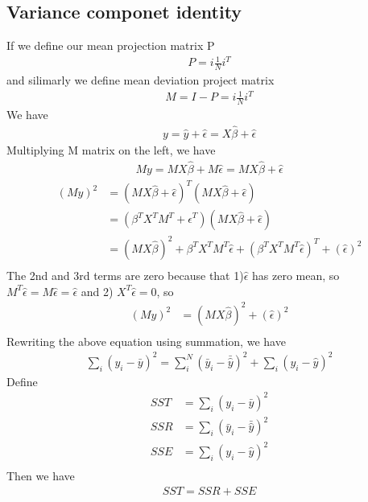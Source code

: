 \documentclass[a4paper]{article}
\begin{document}
\subsection{Variance componet identity}
If we define our mean projection matrix P 
\begin{align*}
P = i \frac{1}{N}i^T
\end{align*}
and silimarly we define mean deviation project matrix 
\begin{align*}
M= I-P = i\frac{1}{N}i^T
\end{align*}
We have
\begin{align*}
y= \hat y + \hat \epsilon = X\hat \beta + \hat \epsilon
\end{align*}
Multiplying M matrix on the left, we have
\begin{align*}
My= MX\hat \beta + M \hat \epsilon = MX\hat \beta +\hat \epsilon
\end{align*}
\begin{align*}
(My)^2 &= (MX\hat \beta + \hat \epsilon)^T(MX\hat \beta +  \hat \epsilon) \\
&=(\beta^T X^T M^T + \hat \epsilon^T )(MX\hat \beta + \hat \epsilon) \\
&=(MX\hat \beta)^2 + \beta^T X^T M^T \hat \epsilon+ (\beta^T X^T M^T \hat \epsilon)^T  + (\hat \epsilon)^2\\
\end{align*}
The 2nd and 3rd terms are zero because that 1)$\hat \epsilon$ has zero mean, so $M^T\hat \epsilon = M \hat \epsilon = \hat \epsilon$ and 2) $X^T\hat \epsilon = 0$, so
\begin{align*}
(My)^2 &=(MX\hat \beta)^2 + (\hat \epsilon)^2\\
\end{align*}
Rewriting the above equation using summation, we have
\begin{align*}
\sum_i (y_i - \bar y)^2 =\sum_i^N (\bar y_i - \bar {\hat y})^2 + \sum_i(y_i-\hat y)^2
\end{align*}
Define
\begin{align*}
SST & = \sum_i (y_i - \bar y)^2 \\
SSR & = \sum_i (\bar y_i - \bar {\hat y})^2 \\
SSE & = \sum_i(y_i-\hat y)^2\\
\end{align*}
Then we have
\begin{align*}
SST = SSR + SSE
\end{align*}
\end{document}
